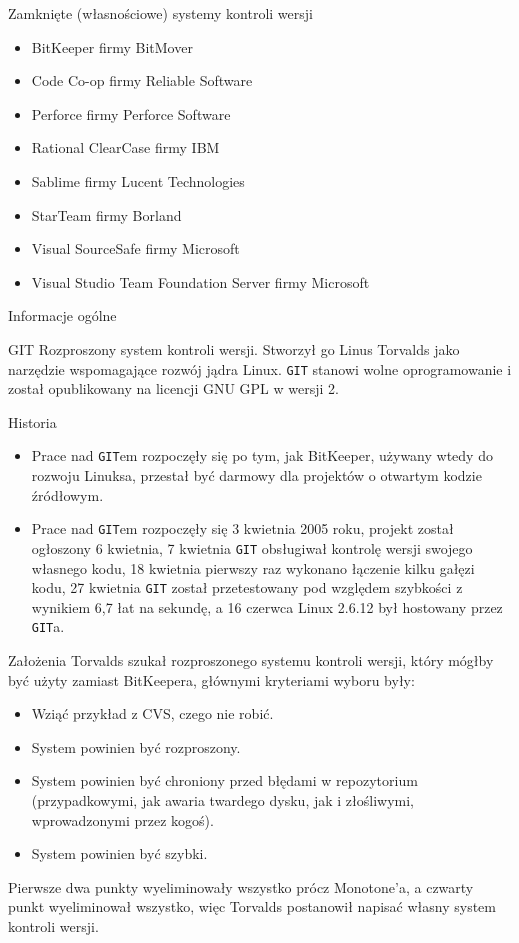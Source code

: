 \documentclass{beamer}
\begin{document}
\begin{frame}{Zamknięte (własnościowe) systemy kontroli wersji}
\begin{itemize}
  \item BitKeeper firmy BitMover
  \item Code Co-op firmy Reliable Software
  \item Perforce firmy Perforce Software
  \item Rational ClearCase firmy IBM
  \item Sablime firmy Lucent Technologies
  \item StarTeam firmy Borland
  \item Visual SourceSafe firmy Microsoft
  \item Visual Studio Team Foundation Server firmy Microsoft
\end{itemize}
\end{frame}

\begin{frame}{Informacje ogólne}
\begin{block}{GIT}
Rozproszony system kontroli wersji. Stworzył go Linus Torvalds jako narzędzie wspomagające rozwój jądra Linux. \texttt{GIT} stanowi wolne oprogramowanie i został opublikowany na licencji GNU GPL w wersji 2.
\end{block}
\end{frame}

\begin{frame}{Historia}
\begin{itemize}
  \item Prace nad \texttt{GIT}em rozpoczęły się po tym, jak BitKeeper, używany wtedy do rozwoju Linuksa, przestał być darmowy dla projektów o otwartym kodzie źródłowym. 
\vskip 1cm
  \item Prace nad \texttt{GIT}em rozpoczęły się 3 kwietnia 2005 roku, projekt został ogłoszony 6 kwietnia, 7 kwietnia \texttt{GIT} obsługiwał kontrolę wersji swojego własnego kodu, 18 kwietnia pierwszy raz wykonano łączenie kilku gałęzi kodu, 27 kwietnia \texttt{GIT} został przetestowany pod względem szybkości z wynikiem 6,7 łat na sekundę, a 16 czerwca Linux 2.6.12 był hostowany przez \texttt{GIT}a.
\end{itemize}
\end{frame}

\begin{frame}{Założenia}
Torvalds szukał rozproszonego systemu kontroli wersji, który mógłby być użyty zamiast BitKeepera, głównymi kryteriami wyboru były:
\begin{itemize}
  \item Wziąć przykład z CVS, czego nie robić.
  \item System powinien być rozproszony.
  \item System powinien być chroniony przed błędami w repozytorium (przypadkowymi, jak awaria twardego dysku, jak i złośliwymi, wprowadzonymi przez kogoś).
  \item System powinien być szybki.
\end{itemize}
Pierwsze dwa punkty wyeliminowały wszystko prócz Monotone'a, a czwarty punkt wyeliminował wszystko, więc Torvalds postanowił napisać własny system kontroli wersji.
\end{frame}
\end{document}
